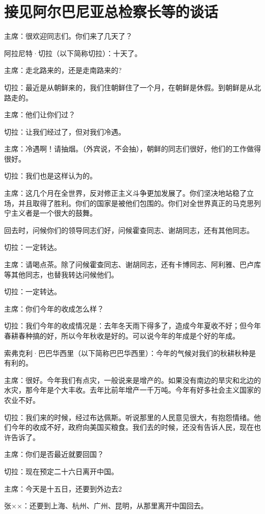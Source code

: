 \section[接见阿尔巴尼亚总检察长等的谈话（一九六三年十一月十五日）]{接见阿尔巴尼亚总检察长等的谈话}


主席：很欢迎同志们。你们来了几天了？

阿拉尼特·切拉（以下简称切拉）：十天了。

主席：走北路来的，还是走南路来的?

切拉：最近是从朝鲜来的，我们住朝鲜住了一个月，在朝鲜是休假。到朝鲜是从北路走的。

主席：他们让你们过？

切拉：让我们经过了，但对我们冷遇。

主席：冷遇啊！请抽烟。（外宾说，不会抽），朝鲜的同志们很好，他们的工作做得很好。

切拉：我们也是这样认为的。

主席：这几个月在全世界，反对修正主义斗争更加发展了。你们坚决地站稳了立场，并且取得了胜利。你们的国家是被他们包围的。你们对全世界真正的马克思列宁主义者是一个很大的鼓舞。

回去时，问候你们的领导同志们好，问候霍查同志、谢胡同志，还有其他同志。

切拉：一定转达。

主席：请喝点茶。除了问候霍查同志、谢胡同志，还有卡博同志、阿利雅、巴卢库等其他同志，也替我转达问候他们。

切拉：一定转达。

主席：你们今年的收成怎么样？

切拉：我们今年的收成情况是：去年冬天雨下得多了，造成今年夏收不好；但今年春耕春种搞的好，所以今年秋收是好的。可以说今年的年成是个好的年成。

索弗克利·巴巴华西里（以下简称巴巴华西里）：今年的气候对我们的秋耕秋种是有利的。

主席：很好。今年我们有点灾，一般说来是增产的。如果没有南边的旱灾和北边的水灾，那今年是个大丰收。去年比前年增产一千万吨。今年有好多社会主义国家的农业不好。

切拉：我们来的时候，经过布达佩斯。听说那里的人民意见很大，有抱怨情绪。他们今年的收成不好，政府向美国买粮食。我们去的时候，还没有告诉人民，现在也许告诉了。

主席：你们是否最近就要回国？

切拉：现在预定二十六日离开中国。

主席：今天是十五日，还要到外边去2

张××：还要到上海、杭州、广州、昆明，从那里离开中国回去。

